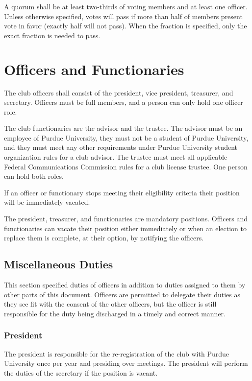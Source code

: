 \documentclass{article}
\begin{document}
A quorum shall be at least two-thirds of voting members and at least one
officer. Unless otherwise specified, votes will pass if more than half of
members present vote in favor (exactly half will not pass). When the fraction is
specified, only the exact fraction is needed to pass.

\section{Officers and Functionaries}

The club officers shall consist of the president, vice president, treasurer, and
secretary. Officers must be full members, and a person can only hold one officer
role.

The club functionaries are the advisor and the trustee. The advisor must be an
employee of Purdue University, they must not be a student of Purdue University,
and they must meet any other requirements under Purdue University student
organization rules for a club advisor. The trustee must meet all applicable
Federal Communications Commission rules for a club license trustee. One person
can hold both roles.

If an officer or functionary stops meeting their eligibility criteria their
position will be immediately vacated.

The president, treasurer, and functionaries are mandatory positions. Officers
and functionaries can vacate their position either immediately or when an
election to replace them is complete, at their option, by notifying the
officers.

\subsection{Miscellaneous Duties}

This section specified duties of officers in addition to duties assigned to them
by other parts of this document. Officers are permitted to delegate their duties
as they see fit with the consent of the other officers, but the officer is still
responsible for the duty being discharged in a timely and correct manner.

\subsubsection{President}

The president is responsible for the re-registration of the club with Purdue
University once per year and presiding over meetings. The president will perform
the duties of the secretary if the position is vacant.
\end{document}
